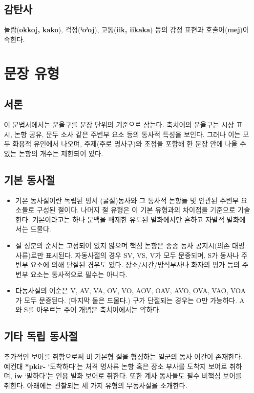\subsection{감탄사}
놀람(\textbf{okkoj, kako}), 걱정(\textbf{ˀoˀoj}), 고통(\textbf{iik, iikaka}) 등의 감정 표현과 호출어(\textbf{mej})이 속한다.

\section{문장 유형}
\subsection{서론}
이 문법서에서는 운율구를 문장 단위의 기준으로 삼는다. 축치어의 운율구는 시상 표시, 논항 공유, 문두 소사 같은 주변부 요소 등의 통사적 특성을 보인다. 그러나 이는 모두 화용적 유인에서 나오며, 주제(주로 명사구)와 초점을 포함해 한 문장 안에 나올 수 있는 논항의 개수는 제한되어 있다.
\subsection{기본 동사절}
\begin{itemize}
	\item 기본 동사절이란 독립된 평서 (굴절)동사와 그 통사적 논항들 및 연관된 주변부 요소들로 구성된 절이다. 나머지 절 유형은 이 기본 유형과의 차이점을 기준으로 기술한다. 기본이라고는 하나 문맥을 배제한 유도된 발화에서만 흔하고 자발적 발화에서는 드물다.
	\item 절 성분의 순서는 고정되어 있지 않으며 핵심 논항은 종종 동사 공지시(의존 대명사류)로만 표시된다. 자동사절의 경우 SV, VS, V가 모두 문증되며, S가 동사나 주변부 요소에 의해 단절된 경우도 있다. 장소/시간/방식부사나 화자의 평가 등의 주변부 요소는 통사적으로 필수는 아니다.
	\item 타동사절의 어순은 V, AV, VA, OV, VO, AOV, OAV, AVO, OVA, VAO, VOA가 모두 문증된다. (마지막 둘은 드물다.) 구가 단절되는 경우는 O만 가능하다. A와 S를 아우르는 주어 개념은 축치어에서는 약하다.
\end{itemize}
\subsection{기타 독립 동사절}
추가적인 보어를 취함으로써 비 기본형 절을 형성하는 일군의 동사 어간이 존재한다. 예컨대 \textbf{*pkir-} `도착하다'는 처격 명사류 논항 혹은 장소 부사를 도착지 보어로 취하며, \textbf{iw} `말하다'는 인용 발화 보어로 취한다. 또한 계사 동사들도 필수 비핵심 보어를 취한다. 아래에는 관찰되는 세 가지 유형의 무동사절을 소개한다.
